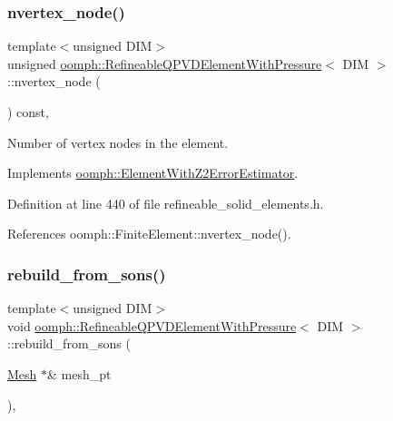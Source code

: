 \subsubsection{\texorpdfstring{nvertex\+\_\+node()}{nvertex\_node()}}
{\footnotesize\ttfamily template$<$unsigned D\+IM$>$ \\
unsigned \hyperlink{classoomph_1_1RefineableQPVDElementWithPressure}{oomph\+::\+Refineable\+Q\+P\+V\+D\+Element\+With\+Pressure}$<$ D\+IM $>$\+::nvertex\+\_\+node (\begin{DoxyParamCaption}{ }\end{DoxyParamCaption}) const\hspace{0.3cm}{\ttfamily [inline]}, {\ttfamily [virtual]}}



Number of vertex nodes in the element. 



Implements \hyperlink{classoomph_1_1ElementWithZ2ErrorEstimator_a19495a0e77ef4ff35f15fdf7913b4077}{oomph\+::\+Element\+With\+Z2\+Error\+Estimator}.



Definition at line 440 of file refineable\+\_\+solid\+\_\+elements.\+h.



References oomph\+::\+Finite\+Element\+::nvertex\+\_\+node().

\mbox{\label{classoomph_1_1RefineableQPVDElementWithPressure_ad3d90fabb0a853d969b8b3a0115bcabc}} 
\subsubsection{\texorpdfstring{rebuild\+\_\+from\+\_\+sons()}{rebuild\_from\_sons()}\hspace{0.1cm}{\footnotesize\ttfamily [1/3]}}
{\footnotesize\ttfamily template$<$unsigned D\+IM$>$ \\
void \hyperlink{classoomph_1_1RefineableQPVDElementWithPressure}{oomph\+::\+Refineable\+Q\+P\+V\+D\+Element\+With\+Pressure}$<$ D\+IM $>$\+::rebuild\+\_\+from\+\_\+sons (\begin{DoxyParamCaption}\item[{\hyperlink{classoomph_1_1Mesh}{Mesh} $\ast$\&}]{mesh\+\_\+pt }\end{DoxyParamCaption})\hspace{0.3cm}{\ttfamily [inline]}, {\ttfamily [virtual]}}



